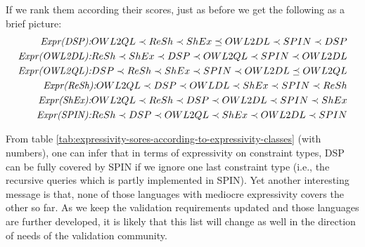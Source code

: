 \documentclass{llncs}
\begin{document}
If we rank them according their scores, just as before we get the following as a brief picture:
\begin{eqnarray*} 
\emph{Expr(DSP):} OWL2QL \prec ReSh \prec ShEx \preceq OWL2DL \prec SPIN \prec DSP \\
\emph{Expr(OWL2DL):} ReSh \prec ShEx \prec DSP \prec OWL2QL \prec SPIN \prec OWL2DL \\
\emph{Expr(OWL2QL):} DSP \prec ReSh \prec ShEx \prec SPIN \prec OWL2DL \preceq OWL2QL \\
\emph{Expr(ReSh):} OWL2QL \prec DSP \prec OWLDL \prec ShEx \prec SPIN \prec ReSh \\
\emph{Expr(ShEx):} OWL2QL \prec ReSh \prec DSP \prec OWL2DL \prec SPIN \prec ShEx \\
\emph{Expr(SPIN):} ReSh \prec DSP \prec OWL2QL \prec ShEx \prec OWL2DL \prec SPIN
\end{eqnarray*}

From table \ref{tab:expressivity-sores-according-to-expressivity-classes} (with numbers), one can infer that in terms of expressivity on constraint types, DSP can be fully covered by SPIN if we ignore one last constraint type (i.e., the recursive queries which is partly implemented in SPIN). Yet another interesting message is that, none of those languages with mediocre expressivity covers the other so far. As we keep the validation requirements updated and those languages are further developed, it is likely that this list will change as well in the direction of needs of the validation community.
\end{document}
